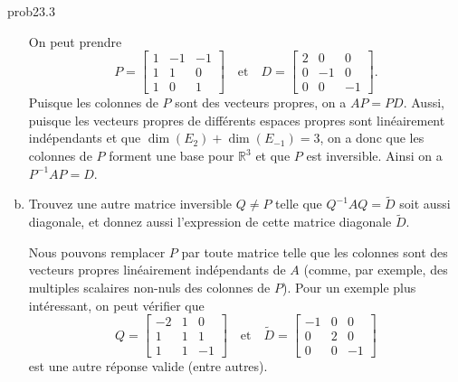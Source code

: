 \begin{sol}{prob23.3}
\begin{enumerate}[a)]
\soln On peut prendre
$$ 
P=\begin{bmatrix} 1 &-1 & -1 \\ 1 & 1 & 0\\ 1 & 0 & 1\end{bmatrix}
\quad \text{et} \quad 
D = \begin{bmatrix} 2 & 0 & 0 \\ 0 & -1 & 0 \\ 0 & 0 & -1 \end{bmatrix}.
$$
Puisque les colonnes de $P$ sont des vecteurs propres, on a $AP=PD$.  Aussi, puisque les vecteurs propres de différents espaces propres sont linéairement indépendants et que $\dim(E_2)+\dim(E_{-1})=3$, on a donc que les colonnes de $P$ forment une base pour $\mathbb{R}^3$ et que $P$ est inversible.  Ainsi on a $P^{-1}AP=D$.

\medskip
\item Trouvez une autre matrice inversible
$Q \not=P$ telle que $Q^{-1}AQ=\tilde D$ soit aussi diagonale, et donnez aussi l'expression de cette matrice diagonale $\tilde D$.

\soln
Nous pouvons remplacer $P$ par toute matrice telle que les colonnes sont des vecteurs propres linéairement indépendants de $A$ (comme, par exemple, des multiples scalaires non-nuls des colonnes de $P$).  Pour un exemple plus intéressant, on peut vérifier que
$$
Q=\begin{bmatrix} 
-2 & 1 & 0 \\ 
1 & 1 & 1\\ 
1 & 1 & - 1\end{bmatrix}
\quad \text{et} \quad 
\tilde D = \begin{bmatrix} -1 & 0 & 0 \\ 0 & 2 & 0 \\ 0 & 0 & -1 \end{bmatrix}
$$
est une autre r\'eponse valide (entre autres).

\end{enumerate}



\end{sol}